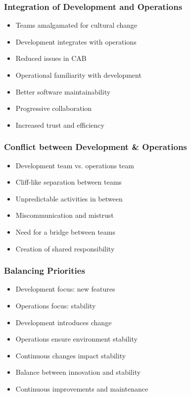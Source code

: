 \documentclass[aspectratio=169, table]{beamer}
\begin{document}
\begin{frame}
	\frametitle{Integration of Development and Operations}
	\begin{itemize}
		\item Teams amalgamated for cultural change
		\item Development integrates with operations
		\item Reduced issues in CAB
		\item Operational familiarity with development
		\item Better software maintainability
		\item Progressive collaboration
		\item Increased trust and efficiency
	\end{itemize}
\end{frame}

\begin{frame}
	\frametitle{Conflict between Development \& Operations}
	\begin{itemize}
		\item Development team vs. operations team
		\item Cliff-like separation between teams
		\item Unpredictable activities in between
		\item Miscommunication and mistrust
		\item Need for a bridge between teams
		\item Creation of shared responsibility
	\end{itemize}
\end{frame}

\begin{frame}
	\frametitle{Balancing Priorities}
	\begin{itemize}
		\item Development focus: new features
		\item Operations focus: stability
		\item Development introduces change
		\item Operations ensure environment stability
		\item Continuous changes impact stability
		\item Balance between innovation and stability
		\item Continuous improvements and maintenance
	\end{itemize}
\end{frame}
\end{document}

